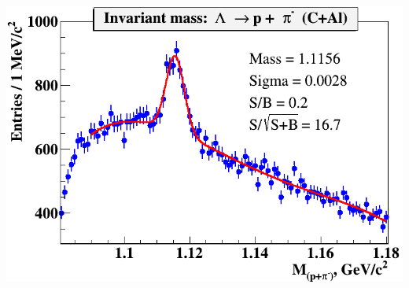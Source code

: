 \documentclass[dvipsnames] {beamer}
\begin{document}
\begin{frame}
\begin{columns}[t]
\begin{block}{\bf {}}
\begin{minipage}{.49\linewidth}
        \includegraphics[width=1.\linewidth]{lambda_Al.png}
      \end{minipage}
    \end{block}
  \end{columns}
\end{frame}
\end{document}
